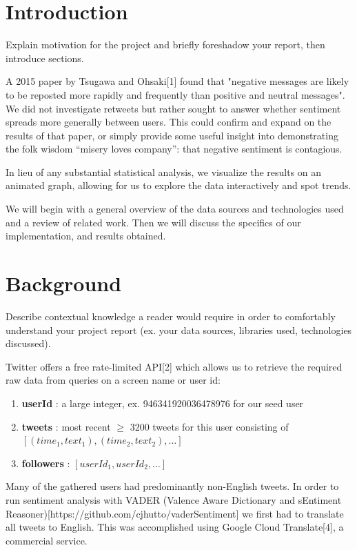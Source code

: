 \documentclass[12pt]{article}
\begin{document}
\section{Introduction}
Explain motivation for the project and briefly foreshadow your report, then introduce sections.\newline

A 2015 paper by Tsugawa and Ohsaki[1] found that "negative messages are likely to be reposted more rapidly and frequently than positive and neutral messages". We did not investigate retweets but rather sought to answer whether sentiment spreads more generally between users. This could confirm and expand on the results of that paper, or simply provide some useful insight into demonstrating the folk wisdom “misery loves company”: that negative sentiment is contagious.\newline

In lieu of any substantial statistical analysis, we visualize the results on an animated graph, allowing for us to explore the data interactively and spot trends.\newline

We will begin with a general overview of the data sources and technologies used and a review of related work. Then we will discuss the specifics of our implementation, and results obtained.


\section{Background}
Describe contextual knowledge a reader would require in order to comfortably understand your project report (ex. your data sources, libraries used, technologies discussed).\newline

Twitter offers a free rate-limited API[2] which allows us to retrieve the required raw data from queries on a screen name or user id:
\begin{enumerate}
    \item \textbf{userId} : a large integer, ex. 946341920036478976 for our seed user
    \item \textbf{tweets} : most recent $\geq$ 3200 tweets for this user consisting of $[(time_1, text_1), (time_2, text_2), \dots]$ 
    \item \textbf{followers} : $[userId_1, userId_2, \dots]$
\end{enumerate}

Many of the gathered users had predominantly non-English tweets. In order to run sentiment analysis with VADER (Valence Aware Dictionary and sEntiment Reasoner)[https://github.com/cjhutto/vaderSentiment] we first had to translate all tweets to English. This was accomplished using Google Cloud Translate[4], a commercial service.\newline
\end{document}
